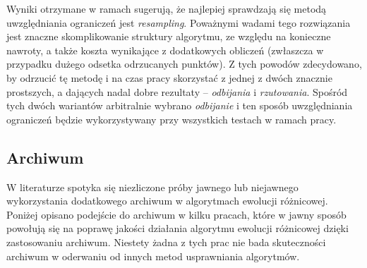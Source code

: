 \documentclass[12pt,a4paper]{report}
\begin{document}
{{{{\begin{description}
\end{description}
}
\par{
Wyniki otrzymane w ramach \cite{Boundary} sugerują, że najlepiej sprawdzają się metodą uwzględniania ograniczeń jest \emph{resampling}. Poważnymi wadami tego rozwiązania jest znaczne skomplikowanie struktury algorytmu, ze względu na konieczne nawroty, a także koszta wynikające z dodatkowych obliczeń (zwłaszcza w przypadku dużego odsetka odrzucanych punktów). Z tych powodów zdecydowano, by odrzucić tę metodę i na czas pracy skorzystać z jednej z dwóch znacznie prostszych, a dających nadal dobre rezultaty -- \emph{odbijania} i \emph{rzutowania}. Spośród tych dwóch wariantów arbitralnie wybrano \emph{odbijanie} i ten sposób uwzględniania ograniczeń będzie wykorzystywany przy wszystkich testach w ramach pracy.
}

\subsection{Archiwum}
\label{ArchiveLiterature}
\par{
W literaturze spotyka się niezliczone próby jawnego lub niejawnego wykorzystania dodatkowego archiwum w algorytmach ewolucji różnicowej. Poniżej opisano podejście do archiwum w kilku pracach, które w jawny sposób powołują się na poprawę jakości działania algorytmu ewolucji różnicowej dzięki zastosowaniu archiwum. Niestety żadna z tych prac nie bada skuteczności archiwum w oderwaniu od innych metod usprawniania algorytmów.
}
}}}
\end{document}
